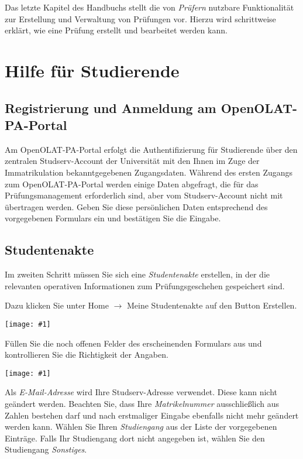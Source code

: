 \documentclass[a4paper,11pt]{article}
\newcommand{\bild}[1]{
    \begin{center}\texttt{[image: \#1]}\end{center}
}
\newcommand{\knopf}[1]{{\sc #1}}
\begin{document}
Das letzte Kapitel des Handbuchs stellt die von {\em Prüfern}
nutzbare Funktionalität zur Erstellung und Verwaltung von Prüfungen vor.
Hierzu wird schrittweise erklärt, wie eine Prüfung erstellt und bearbeitet
werden kann.

\clearpage
\section{Hilfe für Studierende}

\subsection{Registrierung und Anmeldung am OpenOLAT-PA-Portal}

Am OpenOLAT-PA-Portal erfolgt die Authentifizierung für Studierende über den
zentralen Studserv-Account der Universität mit den Ihnen im Zuge der
Immatrikulation bekanntgegebenen Zugangsdaten.  Während des ersten Zugangs zum
OpenOLAT-PA-Portal werden einige Daten abgefragt, die für das Prüfungsmanagement
erforderlich sind, aber vom Studserv-Account nicht mit übertragen werden.
Geben Sie diese persönlichen Daten entsprechend des vorgegebenen Formulars ein
und bestätigen Sie die Eingabe.

\subsection{Studentenakte}

Im zweiten Schritt müssen Sie sich eine {\em Studentenakte}
erstellen, in der die relevanten operativen Informationen zum
Prüfungsgeschehen gespeichert sind. 

Dazu klicken Sie unter \knopf{Home $\rightarrow$ Meine Studentenakte} auf den Button
\knopf{Erstellen}.

\bild{esf-new}

Füllen Sie die noch offenen Felder des erscheinenden Formulars aus und
kontrollieren Sie die Richtigkeit der Angaben.

\bild{esf-new2}

Als {\em E-Mail-Adresse} wird Ihre Studserv-Adresse verwendet.
Diese kann nicht geändert werden. Beachten Sie, dass Ihre {\em Matrikelnummer}
ausschließlich aus Zahlen bestehen darf und nach erstmaliger Eingabe ebenfalls
nicht mehr geändert werden kann. Wählen Sie Ihren {\em Studiengang}
aus der Liste der vorgegebenen Einträge.  Falls Ihr Studiengang dort nicht
angegeben ist, wählen Sie den Studiengang {\em Sonstiges}.
\end{document}
